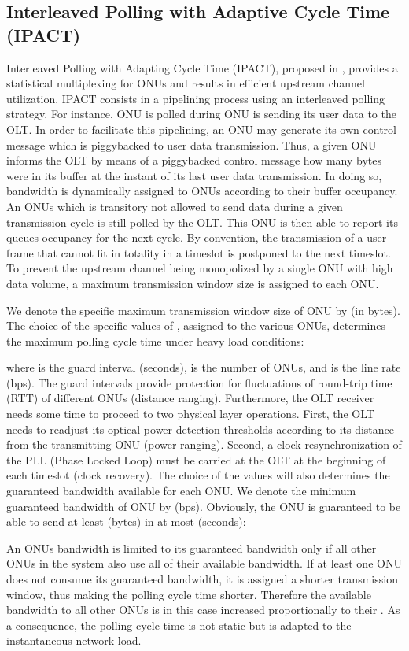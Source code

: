 \documentclass[a4paper,10pt]{IEEEtran}
\begin{document}
\subsection{Interleaved Polling with Adaptive Cycle Time (IPACT)}
Interleaved Polling with Adapting Cycle Time (IPACT), proposed in
\cite{Kramer:IPACT}, provides a statistical multiplexing for ONUs
and results in efficient upstream channel utilization. IPACT
consists in a pipelining process using an interleaved polling
strategy. For instance, ONU is polled during ONU is
sending its user data to the OLT. In order to facilitate this
pipelining, an ONU may generate its own control message which is
piggybacked to user data transmission. Thus, a given ONU informs the
OLT by means of a piggybacked control message how many bytes were in
its buffer at the instant of its last user data transmission. In
doing so, bandwidth is dynamically assigned to ONUs according to
their buffer occupancy. An ONUs which is transitory not allowed to
send data during a given transmission cycle is still polled by the
OLT. This ONU is then able to report its queues occupancy for the
next cycle. By convention, the transmission of a user frame that
cannot fit in totality in a timeslot is postponed to the next
timeslot. To prevent the upstream channel being monopolized by a
single ONU with high data volume, a maximum transmission window size
is assigned to each ONU.

We denote the specific maximum transmission window size of ONU
by  (in bytes). The choice of the specific values of
, assigned to the various ONUs, determines the
maximum polling cycle time  under heavy load conditions:

where  is the guard interval (seconds),  is the number of
ONUs, and  is the line rate (bps). The guard intervals
provide protection for fluctuations of round-trip time (RTT) of
different ONUs (distance ranging). Furthermore, the OLT receiver
needs some time to proceed to two physical layer operations. First,
the OLT needs to readjust its optical power detection thresholds
according to its distance from the transmitting ONU (power ranging).
Second, a clock resynchronization of the PLL (Phase Locked Loop)
must be carried at the OLT at the beginning of each timeslot (clock
recovery). The choice of the  values will also
determines the guaranteed bandwidth available for each ONU. We
denote the minimum guaranteed bandwidth of ONU by
 (bps). Obviously, the ONU is guaranteed to be
able to send at least  (bytes) in at most 
(seconds):


An ONUs bandwidth is limited to its guaranteed bandwidth only if all
other ONUs in the system also use all of their available bandwidth.
If at least one ONU does not consume its guaranteed bandwidth, it is
assigned a shorter transmission window, thus making the polling
cycle time shorter. Therefore the available bandwidth to all other
ONUs is in this case increased proportionally to their
. As a consequence, the polling cycle time is not
static but is adapted to the instantaneous network load.
\end{document}
